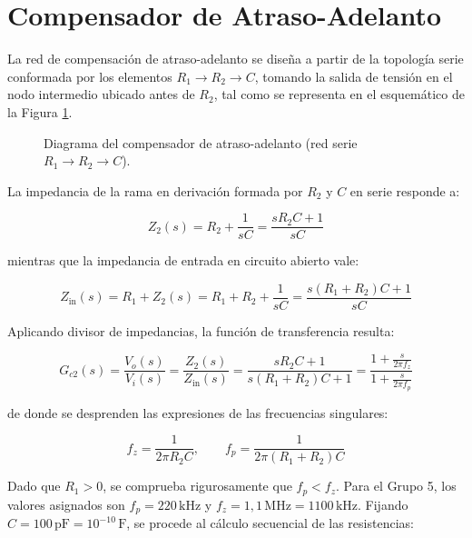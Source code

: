 \clearpage

\section{Compensador de Atraso-Adelanto}

La red de compensación de atraso-adelanto se diseña a partir de la topología serie conformada por los elementos $R_1 \to R_2 \to C$,
tomando la salida de tensión en el nodo intermedio ubicado antes de $R_2$, tal como se representa en el esquemático de la
Figura \ref{crkt.ej2:atraso_adelanto}.

\begin{figure}[!ht]
    \centering
    
    \caption{Diagrama del compensador de atraso-adelanto (red serie $R_1 \to R_2 \to C$).}
    \label{crkt.ej2:atraso_adelanto}
\end{figure}

La impedancia de la rama en derivación formada por $R_2$ y $C$ en serie responde a:

\begin{equation}
    Z_2(s) = R_2 + \frac{1}{sC} = \frac{sR_2C + 1}{sC}
\end{equation}

mientras que la impedancia de entrada en circuito abierto vale:

\begin{equation}
    Z_{\text{in}}(s) = R_1 + Z_2(s) = R_1 + R_2 + \frac{1}{sC} = \frac{s(R_1 + R_2)C + 1}{sC}
\end{equation}

Aplicando divisor de impedancias, la función de transferencia resulta:

\begin{equation}
    G_{c2}(s) = \frac{V_o(s)}{V_i(s)} = \frac{Z_2(s)}{Z_{\text{in}}(s)} = \frac{sR_2C + 1}{s(R_1 + R_2)C + 1} = \frac{1 + \frac{s}{2\pi f_z}}{1 + \frac{s}{2\pi f_p}}
    \label{eq.ej2:fdt_atraso_adelanto_canonica}
\end{equation}

de donde se desprenden las expresiones de las frecuencias singulares:

\begin{equation}
    f_z = \frac{1}{2\pi R_2 C}, \qquad f_p = \frac{1}{2\pi (R_1 + R_2) C}
    \label{eq.ej2:fz_fp_expresiones}
\end{equation}

Dado que $R_1 > 0$, se comprueba rigurosamente que $f_p < f_z$. Para el Grupo 5, los valores asignados son $f_p = 220\,\si{\kilo\hertz}$
y $f_z = 1,1\,\si{\mega\hertz} = 1100\,\si{\kilo\hertz}$. Fijando $C = 100\,\si{\pico\farad} = 10^{-10}\,\si{\farad}$, se procede al
cálculo secuencial de las resistencias:

